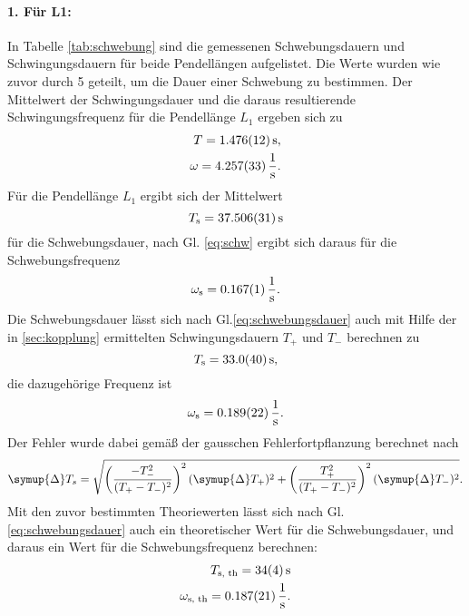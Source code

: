\paragraph{1. Für L1: }
In Tabelle \ref{tab:schwebung} sind die gemessenen Schwebungsdauern und Schwingungsdauern für beide Pendellängen aufgelistet. Die Werte wurden wie zuvor durch 5 geteilt, um die Dauer einer Schwebung zu bestimmen.
Der Mittelwert der Schwingungsdauer und die daraus resultierende Schwingungsfrequenz für die Pendellänge $L_1$ ergeben sich zu
\begin{align*}
    T = \SI{1.476 +- 0.012}{s}, \\
    \omega = \SI{4.257 +- 0.033}{\frac{1}{s}} .
\end{align*}
Für die Pendellänge $L_1$ ergibt sich der Mittelwert
\begin{equation*}
    T_\text{s} = \SI{37.506 +- 0.031}{s}
\end{equation*}
für die Schwebungsdauer, nach Gl. \eqref{eq:schw} ergibt sich daraus für die Schwebungsfrequenz
\begin{equation*}
    \omega_\text{s} = \SI{0.167 +- 0.001}{\frac{1}{s}} .
\end{equation*}
Die Schwebungsdauer lässt sich nach Gl.\eqref{eq:schwebungsdauer} auch mit Hilfe der in \ref{sec:kopplung} ermittelten Schwingungsdauern $T_+$ und $T_-$ berechnen zu
\begin{equation*}
    T_\text{s} = \SI{33.0 +- 4.0}{s}, 
\end{equation*}
die dazugehörige Frequenz ist
\begin{equation*}
    \omega_\text{s} = \SI{0.189 +- 0.022}{\frac{1}{s}} .
\end{equation*}
Der Fehler wurde dabei gemäß der gausschen Fehlerfortpflanzung berechnet nach
\begin{equation*}
    \symup{\Delta} T_s = \sqrt{ \left( \frac{- T_-^2}{(T_+-T_-)^2} \right)^2 (\symup{\Delta} T_+)^2 + \left( \frac{T_+^2}{ (T_+ - T_- )^2}  \right)^2 (\symup{\Delta} T_-)^2 } .
\end{equation*}
Mit den zuvor bestimmten Theoriewerten lässt sich nach Gl. \eqref{eq:schwebungsdauer} auch ein theoretischer Wert für die Schwebungsdauer, und daraus ein Wert für die Schwebungsfrequenz
berechnen:
\begin{align*}
    T_\text{s, th} = \SI{34 +- 4}{s} \\
    \omega_\text{s, th} = \SI{0.187 +- 0.021}{\frac{1}{s}} .
\end{align*}

